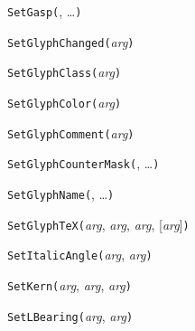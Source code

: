 \texttt{SetGasp(}, \ldots\texttt{)}



\texttt{SetGlyphChanged(}\textit{arg}\texttt{)}



\texttt{SetGlyphClass(}\textit{arg}\texttt{)}



\texttt{SetGlyphColor(}\textit{arg}\texttt{)}



\texttt{SetGlyphComment(}\textit{arg}\texttt{)}



\texttt{SetGlyphCounterMask(}, \ldots\texttt{)}



\texttt{SetGlyphName(}, \ldots\texttt{)}



\texttt{SetGlyphTeX(}\textit{arg}, \textit{arg}, \textit{arg}, [\textit{arg}]\texttt{)}



\texttt{SetItalicAngle(}\textit{arg}, \textit{arg}\texttt{)}



\texttt{SetKern(}\textit{arg}, \textit{arg}, \textit{arg}\texttt{)}



\texttt{SetLBearing(}\textit{arg}, \textit{arg}\texttt{)}



